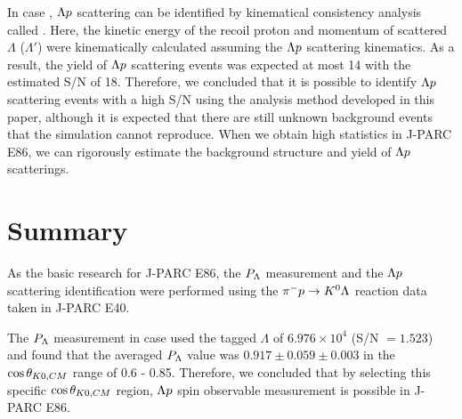 \documentclass[a4paper,11pt,twoside,twocolumn]{article}
\begin{document}
In case , $\Lambda p$ scattering can be identified by kinematical consistency analysis called . Here, the kinetic energy of the recoil proton and momentum of scattered $\Lambda$ ($\Lambda'$) were kinematically calculated assuming the $\Lambda p$ scattering kinematics. %
As a result, the yield of $\Lambda p$ scattering events was expected at most 14 with the estimated S/N of 18. Therefore, we concluded that it is possible to identify $\Lambda p$ scattering events with a high S/N using the analysis method developed in this paper, although it is expected that there are still unknown background events that the simulation cannot reproduce. When we obtain high statistics in J-PARC E86, we can rigorously estimate the background structure and yield of $\Lambda p$ scatterings. 

\section{Summary}
\label{sec-summary}

As the basic research for J-PARC E86, the $P_{\Lambda}$ measurement and the $\Lambda p$ scattering identification were performed using the $\pi^- p \to K^0 \Lambda$ reaction data taken in J-PARC E40. %

The $P_{\Lambda}$ measurement in case  used the tagged $\Lambda$ of $6.976\times10^{4}$ (S/N $=1.523$) and found that the averaged $P_{\Lambda}$ value was $0.917\pm0.059\pm0.003$ in the $\cos{\theta_{K0,CM}}$ range of 0.6 - 0.85. Therefore, we concluded that by selecting this specific $\cos{\theta_{K0,CM}}$ region, $\Lambda p$ spin observable measurement is possible in J-PARC E86.
\end{document}
